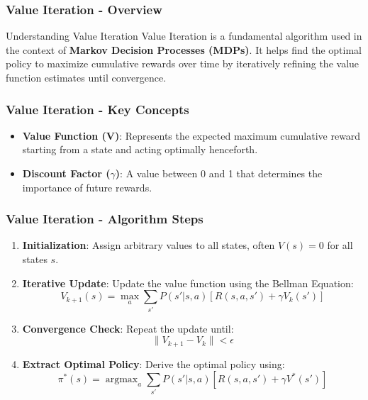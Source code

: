 \documentclass[aspectratio=169]{beamer}
\begin{document}
\begin{frame}[fragile]
    \frametitle{Value Iteration - Overview}
    \begin{block}{Understanding Value Iteration}
        Value Iteration is a fundamental algorithm used in the context of \textbf{Markov Decision Processes (MDPs)}. It helps find the optimal policy to maximize cumulative rewards over time by iteratively refining the value function estimates until convergence.
    \end{block}
\end{frame}

\begin{frame}[fragile]
    \frametitle{Value Iteration - Key Concepts}
    \begin{itemize}
        \item \textbf{Value Function (V)}: Represents the expected maximum cumulative reward starting from a state and acting optimally henceforth.
        \item \textbf{Discount Factor ($\gamma$)}: A value between 0 and 1 that determines the importance of future rewards.
    \end{itemize}
\end{frame}

\begin{frame}[fragile]
    \frametitle{Value Iteration - Algorithm Steps}
    \begin{enumerate}
        \item \textbf{Initialization}: Assign arbitrary values to all states, often $V(s) = 0$ for all states $s$.
        
        \item \textbf{Iterative Update}: Update the value function using the Bellman Equation:
        \begin{equation}
            V_{k+1}(s) = \max_a \sum_{s'} P(s' | s, a) [R(s, a, s') + \gamma V_k(s')]
        \end{equation}
        
        \item \textbf{Convergence Check}: Repeat the update until:
        \begin{equation}
            \| V_{k+1} - V_k \| < \epsilon
        \end{equation}
        
        \item \textbf{Extract Optimal Policy}: Derive the optimal policy using:
        \begin{equation}
            \pi^*(s) = \operatorname{argmax}_a \sum_{s'} P(s' | s, a) [R(s, a, s') + \gamma V^*(s')]
        \end{equation}
    \end{enumerate}
\end{frame}
\end{document}
